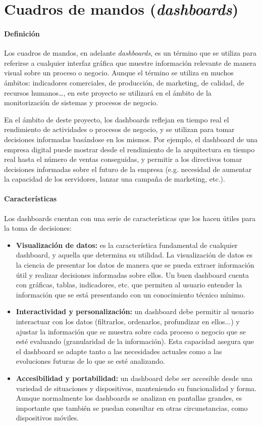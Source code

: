 \newpage{}
\section{Cuadros de mandos (\textit{dashboards})}\label{sec:dashboards}
\paragraph{Definición}
Los cuadros de mandos, en adelante \textit{dashboards},
es un término que se utiliza para referirse a cualquier interfaz gráfica que muestre información
relevante de manera visual sobre un proceso o negocio. Aunque el término se utiliza en
muchos ámbitos: indicadores comerciales, de producción, de marketing, de calidad, de recursos
humanos\ldots, en este proyecto se utilizará en el ámbito de la monitorización de sistemas y
procesos de negocio.

En el ámbito de deste proyecto, los dashboards reflejan en tiempo real el rendimiento de
actividades o procesos de negocio, y se utilizan para tomar decisiones informadas basándose en
los mismos. Por ejemplo, el dashboard de una empresa digital puede mostrar desde el rendimiento de la
arquitectura en tiempo real hasta el número de ventas conseguidas, y permitir a los directivos tomar
decisiones informadas sobre el futuro de la empresa (e.g. necesidad de aumentar la capacidad de los
servidores, lanzar una campaña de marketing, etc.).

\paragraph{Características}
Los dashboards cuentan con una serie de características que los hacen útiles para la toma de
decisiones:~\cite{mier2023dashboards}

\begin{itemize}
	\item \textbf{Visualización de datos:} es la característica fundamental de cualquier
		dashboard, y aquella que determina su utilidad. La visualización de datos
		es la ciencia de presentar los datos de manera que se pueda extraer información útil
		y realizar decisiones informadas sobre ellos. Un buen dashboard cuenta con gráficas,
		tablas, indicadores, etc. que permiten al usuario entender la información que se
		está presentando con un conocimiento técnico mínimo.
	\item \textbf{Interactividad y personalización:} un dashboard debe permitir al usuario
		interactuar con los datos (filtrarlos, ordenarlos, profundizar en ellos...) y ajustar
		la información que se muestra sobre cada proceso o negocio que se esté evaluando
		(granularidad de la información). Esta capacidad asegura que el dashboard se adapte
		tanto a las necesidades actuales como a las evoluciones futuras de lo que se esté analizando.
	\item \textbf{Accesibilidad y portabilidad:} un dashboard debe ser accesible desde una
		variedad de situaciones y dispositivos, manteniendo su funcionalidad y forma. Aunque
		normalmente los dashboards se analizan en pantallas grandes, es importante que también
		se puedan consultar en otras circunstancias, como dispositivos móviles.
\end{itemize}

